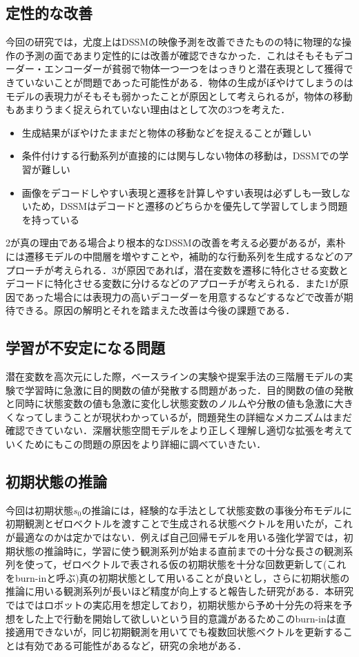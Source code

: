 \subsection{定性的な改善}
今回の研究では，尤度上はDSSMの映像予測を改善できたものの特に物理的な操作の予測の面であまり定性的には改善が確認できなかった．これはそもそもデコーダー・エンコーダーが貧弱で物体一つ一つをはっきりと潜在表現として獲得できていないことが問題であった可能性がある．物体の生成がぼやけてしまうのはモデルの表現力がそもそも弱かったことが原因として考えられるが，物体の移動もあまりうまく捉えられていない理由はとして次の3つを考えた．
\begin{itemize}
    \item 生成結果がぼやけたままだと物体の移動などを捉えることが難しい
    \item 条件付けする行動系列が直接的には関与しない物体の移動は，DSSMでの学習が難しい
    \item 画像をデコードしやすい表現と遷移を計算しやすい表現は必ずしも一致しないため，DSSMはデコードと遷移のどちらかを優先して学習してしまう問題を持っている
\end{itemize}
2が真の理由である場合より根本的なDSSMの改善を考える必要があるが，素朴には遷移モデルの中間層を増やすことや，補助的な行動系列を生成するなどのアプローチが考えられる．3が原因であれば，潜在変数を遷移に特化させる変数とデコードに特化させる変数に分けるなどのアプローチが考えられる．また1が原因であった場合には表現力の高いデコーダーを用意するなどするなどで改善が期待できる。原因の解明とそれを踏まえた改善は今後の課題である．

\subsection{学習が不安定になる問題}
潜在変数を高次元にした際，ベースラインの実験や提案手法の三階層モデルの実験で学習時に急激に目的関数の値が発散する問題があった．目的関数の値の発散と同時に状態変数の値も急激に変化し状態変数のノルムや分散の値も急激に大きくなってしまうことが現状わかっているが，問題発生の詳細なメカニズムはまだ確認できていない．深層状態空間モデルをより正しく理解し適切な拡張を考えていくためにもこの問題の原因をより詳細に調べていきたい．

\subsection{初期状態の推論}
今回は初期状態$s_0$の推論には，経験的な手法として状態変数の事後分布モデルに初期観測とゼロベクトルを渡すことで生成される状態ベクトルを用いたが，これが最適なのかは定かではない．例えば自己回帰モデルを用いる強化学習\cite{kapturowski2018recurrent}では，初期状態の推論時に，学習に使う観測系列が始まる直前までの十分な長さの観測系列を使って，ゼロベクトルで表される仮の初期状態を十分な回数更新して(これをburn-inと呼ぶ)真の初期状態として用いることが良いとし，さらに初期状態の推論に用いる観測系列が長いほど精度が向上すると報告した研究がある\cite{kapturowski2018recurrent}．本研究ではではロボットの実応用を想定しており，初期状態から予め十分先の将来を予想をした上で行動を開始して欲しいという目的意識があるためこのburn-inは直接適用できないが，同じ初期観測を用いてでも複数回状態ベクトルを更新することは有効である可能性があるなど，研究の余地がある．

